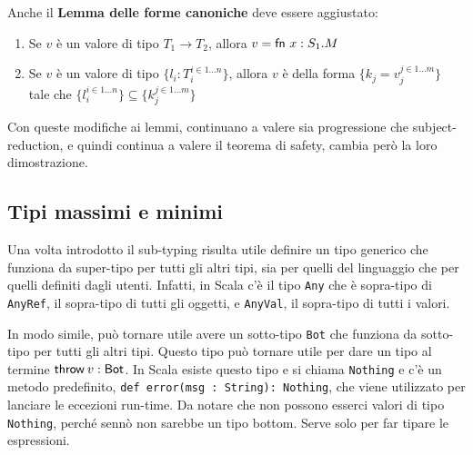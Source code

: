 \noindent Anche il \textbf{Lemma delle forme canoniche} deve essere aggiustato:

\begin{enumerate}
	\item Se $v$ è un valore di tipo $T_1 \to T_2$, allora $v = \fn x : S_1.M$
	\item Se $v$ è un valore di tipo $ \{ l_i : T_i ^{i \in 1 \ldots n} \} $, allora $v$ è della forma $\{ k_j = v_j ^{j \in 1 \ldots m} \}$ tale che $\{ l_i ^{i \in 1\ldots n} \} \subseteq \{ k_j ^{j \in 1\ldots m} \}$
\end{enumerate}

\noindent Con queste modifiche ai lemmi, continuano a valere sia progressione che subject-reduction, e quindi continua a valere il teorema di safety, cambia però la loro dimostrazione.

\subsection{Tipi massimi e minimi}

Una volta introdotto il sub-typing risulta utile definire un tipo generico che funziona da super-tipo per tutti gli altri tipi, sia per quelli del linguaggio che per quelli definiti dagli utenti.
Infatti, in Scala c'è il tipo \texttt{Any} che è sopra-tipo di \texttt{AnyRef}, il sopra-tipo di tutti gli oggetti, e \texttt{AnyVal}, il sopra-tipo di tutti i valori.

In modo simile, può tornare utile avere un sotto-tipo \texttt{Bot} che funziona da sotto-tipo per tutti gli altri tipi. 
Questo tipo può tornare utile per dare un tipo al termine $\throw{v}: \text{Bot}$. In Scala esiste questo tipo e si chiama \texttt{Nothing} e c'è un metodo predefinito, \texttt{def error(msg : String): Nothing}, che viene utilizzato per lanciare le eccezioni run-time. 
Da notare che non possono esserci valori di tipo \texttt{Nothing}, perché sennò non sarebbe un tipo bottom. 
Serve solo per far tipare le espressioni.



